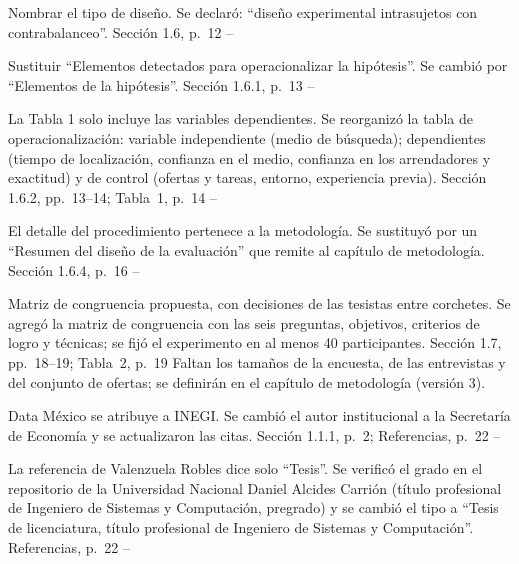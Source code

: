 \documentclass[10pt]{article}
\begin{document}
\begin{matriz}
  {Nombrar el tipo de diseño.}
  {Se declaró: ``diseño experimental intrasujetos con contrabalanceo''.}
  {Sección 1.6, p.~12}
  {\Atendida}{--}{}

  {Sustituir ``Elementos detectados para operacionalizar la hipótesis''.}
  {Se cambió por ``Elementos de la hipótesis''.}
  {Sección 1.6.1, p.~13}
  {\Atendida}{--}{}

  {La Tabla 1 solo incluye las variables dependientes.}
  {Se reorganizó la tabla de operacionalización: variable independiente (medio de búsqueda); dependientes (tiempo de localización, confianza en el medio, confianza en los arrendadores y exactitud) y de control (ofertas y tareas, entorno, experiencia previa).}
  {Sección 1.6.2, pp.~13--14; Tabla~1, p.~14}
  {\Atendida}{--}{}

  {El detalle del procedimiento pertenece a la metodología.}
  {Se sustituyó por un ``Resumen del diseño de la evaluación'' que remite al capítulo de metodología.}
  {Sección 1.6.4, p.~16}
  {\Atendida}{--}{}

  {Matriz de congruencia propuesta, con decisiones de las tesistas entre corchetes.}
  {Se agregó la matriz de congruencia con las seis preguntas, objetivos, criterios de logro y técnicas; se fijó el experimento en al menos 40 participantes.}
  {Sección 1.7, pp.~18--19; Tabla~2, p.~19}
  {\Parcial}
  {Faltan los tamaños de la encuesta, de las entrevistas y del conjunto de ofertas; se definirán en el capítulo de metodología (versión 3).}
  {}

  {Data México se atribuye a INEGI.}
  {Se cambió el autor institucional a la Secretaría de Economía y se actualizaron las citas.}
  {Sección 1.1.1, p.~2; Referencias, p.~22}
  {\Atendida}{--}{}

  {La referencia de Valenzuela Robles dice solo ``Tesis''.}
  {Se verificó el grado en el repositorio de la Universidad Nacional Daniel Alcides Carrión (título profesional de Ingeniero de Sistemas y Computación, pregrado) y se cambió el tipo a ``Tesis de licenciatura, título profesional de Ingeniero de Sistemas y Computación''.}
  {Referencias, p.~22}
  {\Atendida}{--}{}


\end{matriz}
\end{document}
